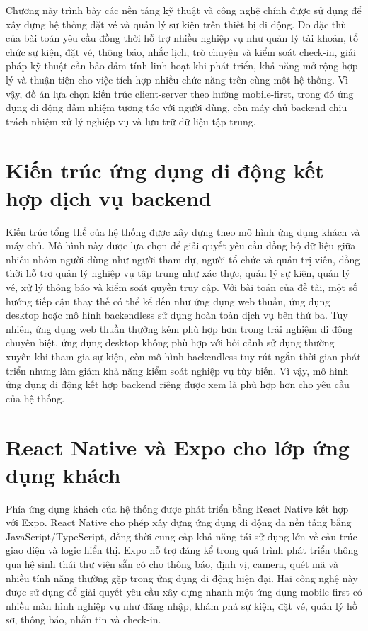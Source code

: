 \documentclass[../DoAn.tex]{subfiles}
\begin{document}
Chương này trình bày các nền tảng kỹ thuật và công nghệ chính được sử dụng để xây dựng hệ thống đặt vé và quản lý sự kiện trên thiết bị di động. Do đặc thù của bài toán yêu cầu đồng thời hỗ trợ nhiều nghiệp vụ như quản lý tài khoản, tổ chức sự kiện, đặt vé, thông báo, nhắc lịch, trò chuyện và kiểm soát check-in, giải pháp kỹ thuật cần bảo đảm tính linh hoạt khi phát triển, khả năng mở rộng hợp lý và thuận tiện cho việc tích hợp nhiều chức năng trên cùng một hệ thống. Vì vậy, đồ án lựa chọn kiến trúc client-server theo hướng mobile-first, trong đó ứng dụng di động đảm nhiệm tương tác với người dùng, còn máy chủ backend chịu trách nhiệm xử lý nghiệp vụ và lưu trữ dữ liệu tập trung.

\section{Kiến trúc ứng dụng di động kết hợp dịch vụ backend}
Kiến trúc tổng thể của hệ thống được xây dựng theo mô hình ứng dụng khách và máy chủ. Mô hình này được lựa chọn để giải quyết yêu cầu đồng bộ dữ liệu giữa nhiều nhóm người dùng như người tham dự, người tổ chức và quản trị viên, đồng thời hỗ trợ quản lý nghiệp vụ tập trung như xác thực, quản lý sự kiện, quản lý vé, xử lý thông báo và kiểm soát quyền truy cập. Với bài toán của đề tài, một số hướng tiếp cận thay thế có thể kể đến như ứng dụng web thuần, ứng dụng desktop hoặc mô hình backendless sử dụng hoàn toàn dịch vụ bên thứ ba. Tuy nhiên, ứng dụng web thuần thường kém phù hợp hơn trong trải nghiệm di động chuyên biệt, ứng dụng desktop không phù hợp với bối cảnh sử dụng thường xuyên khi tham gia sự kiện, còn mô hình backendless tuy rút ngắn thời gian phát triển nhưng làm giảm khả năng kiểm soát nghiệp vụ tùy biến. Vì vậy, mô hình ứng dụng di động kết hợp backend riêng được xem là phù hợp hơn cho yêu cầu của hệ thống.

\section{React Native và Expo cho lớp ứng dụng khách}
Phía ứng dụng khách của hệ thống được phát triển bằng React Native kết hợp với Expo. React Native cho phép xây dựng ứng dụng di động đa nền tảng bằng JavaScript/TypeScript, đồng thời cung cấp khả năng tái sử dụng lớn về cấu trúc giao diện và logic hiển thị. Expo hỗ trợ đáng kể trong quá trình phát triển thông qua hệ sinh thái thư viện sẵn có cho thông báo, định vị, camera, quét mã và nhiều tính năng thường gặp trong ứng dụng di động hiện đại. Hai công nghệ này được sử dụng để giải quyết yêu cầu xây dựng nhanh một ứng dụng mobile-first có nhiều màn hình nghiệp vụ như đăng nhập, khám phá sự kiện, đặt vé, quản lý hồ sơ, thông báo, nhắn tin và check-in.
\end{document}

